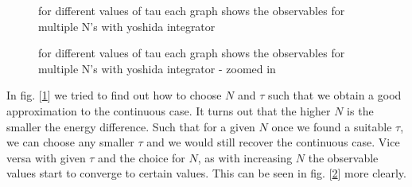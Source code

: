 \documentclass[11pt,a4paper]{article}
\begin{document}
\begin{figure}
\centering
\caption{for different values of tau each graph shows the observables for multiple N's with yoshida integrator}
\label{Fig: obs_cont_sys_e}
\end{figure}

\begin{figure}
\centering
\caption{for different values of tau each graph shows the observables for multiple N's with yoshida integrator - zoomed in}
\label{Fig: obs_cont_sys_e_zoom}
\end{figure}

In fig. [\ref{Fig: obs_cont_sys_e}] we tried to find out how to choose $N$ and
$\tau$ such that we obtain a good approximation to the continuous case. It turns
out that the higher $N$ is the smaller the energy difference. Such that for a
given $N$ once we found a suitable $\tau$, we can choose any smaller $\tau$ and
we would still recover the continuous case. Vice versa with given $\tau$ and the
choice for $N$, as with increasing $N$ the observable values start to converge
to certain values. This can be seen in fig. [\ref{Fig: obs_cont_sys_e_zoom}]
more clearly.\\
\end{document}

